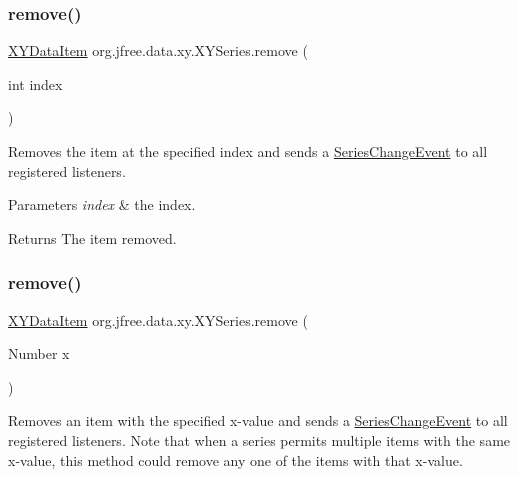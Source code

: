 \subsubsection{\texorpdfstring{remove()}{remove()}\hspace{0.1cm}{\footnotesize\ttfamily [1/2]}}
{\footnotesize\ttfamily \mbox{\hyperlink{classorg_1_1jfree_1_1data_1_1xy_1_1_x_y_data_item}{X\+Y\+Data\+Item}} org.\+jfree.\+data.\+xy.\+X\+Y\+Series.\+remove (\begin{DoxyParamCaption}\item[{int}]{index }\end{DoxyParamCaption})}

Removes the item at the specified index and sends a \mbox{\hyperlink{}{Series\+Change\+Event}} to all registered listeners.


\begin{DoxyParams}{Parameters}
{\em index} & the index.\\
\hline
\end{DoxyParams}
\begin{DoxyReturn}{Returns}
The item removed. 
\end{DoxyReturn}
\mbox{\label{classorg_1_1jfree_1_1data_1_1xy_1_1_x_y_series_a5f0fd3114c59bb71752fd3f3e3f13c8e}} 
\subsubsection{\texorpdfstring{remove()}{remove()}\hspace{0.1cm}{\footnotesize\ttfamily [2/2]}}
{\footnotesize\ttfamily \mbox{\hyperlink{classorg_1_1jfree_1_1data_1_1xy_1_1_x_y_data_item}{X\+Y\+Data\+Item}} org.\+jfree.\+data.\+xy.\+X\+Y\+Series.\+remove (\begin{DoxyParamCaption}\item[{Number}]{x }\end{DoxyParamCaption})}

Removes an item with the specified x-\/value and sends a \mbox{\hyperlink{}{Series\+Change\+Event}} to all registered listeners. Note that when a series permits multiple items with the same x-\/value, this method could remove any one of the items with that x-\/value.


